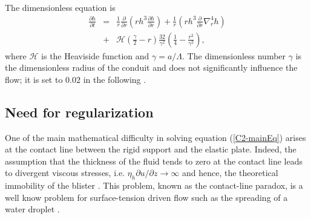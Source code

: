 The dimensionless equation is
\begin{eqnarray}
  \frac{\partial h}{\partial t}& =&\frac{1}{ r}
                                    \frac{\partial}{\partial r}  \left( rh^3  \frac{\partial h}{\partial
                                    r}\right)+\frac{1}{ r} \left( rh^3
                                    \frac{\partial}{\partial
                                    r}\nabla_r^4h\right)\nonumber\\
                               &+&
                                   \mathcal{H}(\frac{\gamma}{2}-r)\frac{32}{\gamma^{2}}\left(\frac{1}{4}-\frac{r^{2}}{\gamma^{2}}\right),
                                   \label{C2-mainEq}
\end{eqnarray}
where $\mathcal{H}$ is the  Heaviside function and $\gamma=a/\Lambda$.
The dimensionless number  $\gamma$ is the dimensionless  radius of the
conduit and  does not significantly influence  the flow; it is  set to
$0.02$ in the following \citep{Michaut:2009jx,Michaut:2011kg}.
	 
\subsection{Need for regularization}
\label{C2-sec:need-regularization}

One  of   the  main   mathematical  difficulty  in   solving  equation
(\ref{C2-mainEq}) arises at the contact line between the rigid support
and the elastic  plate.  Indeed, the assumption that  the thickness of
the fluid tends to zero at the contact line leads to divergent viscous
stresses, i.e.   $\eta_h \partial u/\partial z\rightarrow  \infty$ and
hence,     the    theoretical     immobility     of    the     blister
\citep{Flitton:1999iv,Lister:2013ia,Anonymous:QWXp_4JV}. This problem,
known  as  the  contact-line  paradox,  is a  well  know  problem  for
surface-tension driven flow  such as the spreading of  a water droplet
\citep{Bertozzi:1998wz,Snoeijer:2013cm}.


